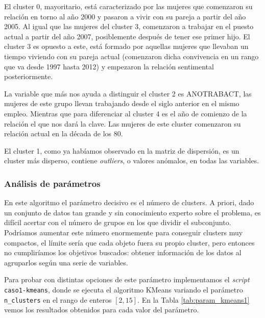 \documentclass[a4paper, 20pt]{article}
\begin{document}
El cluster 0, mayoritario, está caracterizado por las mujeres que comenzaron su relación en torno al año 2000 y pasaron a vivir con su pareja a partir del año 2005. Al igual que las mujeres del cluster 3, comenzaron a trabajar en el puesto actual a partir del año 2007, posiblemente después de tener ese primer hijo. El cluster 3 es opuesto a este, está formado por aquellas mujeres que llevaban un tiempo viviendo con su pareja actual (comenzaron dicha convivencia en un rango que va desde 1997 hasta 2012) y empezaron la relación sentimental posteriormente.

La variable que más nos ayuda a distinguir el cluster 2 es ANOTRABACT, las mujeres de este grupo llevan trabajando desde el siglo anterior en el mismo empleo. Mientras que para diferenciar al cluster 4 es el año de comienzo de la relación el que nos dará la clave. Las mujeres de este cluster comenzaron su relación actual en la década de los 80.

El cluster 1, como ya habíamos observado en la matriz de dispersión, es un cluster más disperso, contiene \textit{outliers}, o valores anómalos, en todas las variables.

\subsubsection{Análisis de parámetros}

En este algoritmo el parámetro decisivo es el número de clusters. A priori, dado un conjunto de datos tan grande y sin conocimiento experto sobre el problema, es difícil acertar con el número de grupos en los que dividir el subconjunto. Podríamos aumentar este número enormemente para conseguir clusters muy compactos, el límite sería que cada objeto fuera su propio cluster, pero entonces no cumpliríamos los objetivos buscados: obtener información de los datos al agruparlos según una serie de variables.

Para probar con distintas opciones de este parámetro implementamos el \textit{script} \texttt{caso1-kmeans}, donde se ejecuta el algoritmo KMeans variando el parámetro \texttt{n\_clusters} en el rango de enteros $[2,15]$. En la Tabla \ref{tab:param_kmeans1} vemos los resultados obtenidos para cada valor del parámetro.
\end{document}
